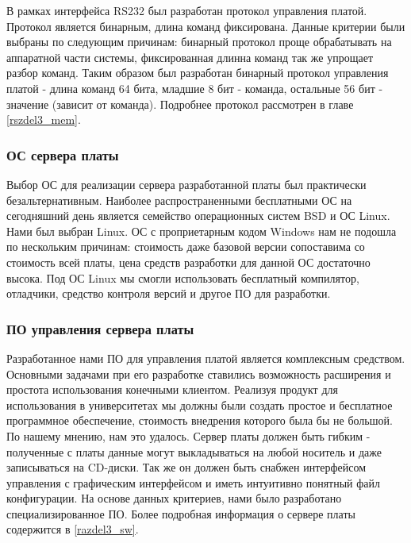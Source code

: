 В рамках интерфейса RS232 был разработан протокол управления платой. Протокол является бинарным, длина команд фиксирована. Данные критерии
были выбраны по следующим причинам: бинарный протокол проще обрабатывать на аппаратной части системы, фиксированная длинна команд так же
упрощает разбор команд. Таким образом был разработан бинарный протокол управления платой - длина команд 64 бита, младшие 8 бит - команда,
остальные 56 бит - значение (зависит от команда). Подробнее протокол рассмотрен в главе \ref{rszdel3_mem}.

\subsubsection{ОС сервера платы}
\label{razdel1_os}
Выбор ОС для реализации сервера разработанной платы был практически безальтернативным. Наиболее распространенными бесплатными ОС
на сегодняшний день является семейство операционных систем BSD и ОС Linux. Нами был выбран Linux. ОС с проприетарным кодом Windows
нам не подошла по нескольким причинам: стоимость даже базовой версии сопоставима со стоимость всей платы, цена средств разработки
для данной ОС достаточно высока. Под ОС Linux мы смогли использовать бесплатный компилятор, отладчики, средство контроля версий
и другое ПО для разработки.

\subsubsection{ПО управления сервера платы}
\label{razdel1_sw}
Разработанное нами ПО для управления платой является комплексным средством. Основными задачами при его разработке ставились возможность
расширения и простота использования конечными клиентом. Реализуя продукт для использования в университетах мы должны были создать
простое и бесплатное программное обеспечение, стоимость внедрения которого была бы не большой. По нашему мнению, нам это удалось.
Сервер платы должен быть гибким - полученные с платы данные могут выкладываться на любой носитель и даже записываться на CD-диски.
Так же он должен быть снабжен интерфейсом управления с графическим интерфейсом и иметь интуитивно понятный файл конфигурации. На основе
данных критериев, нами было разработано специализированное ПО. Более подробная информация о сервере платы содержится в \ref{razdel3_sw}.

\newpage

